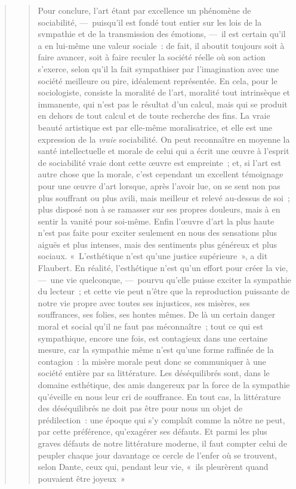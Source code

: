 \documentclass[french,twoside]{book} %
\newcommand\chapterclose{} %
\begin{document}
\begin{verse}
\begin{verse}
Pour conclure, l’art étant par excellence un phénomène de sociabilité, — puisqu’il est fondé tout entier sur les lois de la svmpathie et de la transmission des émotions, — il est certain qu’il a en lui-même une valeur sociale : de fait, il aboutit toujours soit à faire avancer, soit à faire reculer la société réelle où son action s’exerce, selon qu’il la fait sympathiser par l’imagination avec une société meilleure ou pire, idéalement représentée. En cela, pour le sociologiste, consiste la moralité de l’art, moralité tout intrinsèque et immanente, qui n’est pas le résultat d’un calcul, mais qui se produit en dehors de tout calcul et de toute recherche des fins. La vraie beauté artistique est par elle-même moralisatrice, et elle est une expression de la \emph{vraie} sociabilité. On peut reconnaître en moyenne la santé intellectuelle et morale de celui qui a écrit une œuvre à l’esprit de sociabilité vraie dont cette œuvre est empreinte ; et, si l’art est autre chose que la morale, c’est cependant un excellent témoignage pour une œuvre d’art lorsque, après l’avoir lue, on se sent non pas plus souffrant ou plus avili, mais meilleur et relevé au-dessus de soi ; plus disposé non à se ramasser sur ses propres douleurs, mais à en sentir la vanité pour soi-même. Enfin l’œuvre d’art la plus haute n’est pas faite pour exciter seulement en nous des sensations plus aiguës et plus intenses, mais des sentiments plus généreux et plus sociaux. « L’esthétique n’est qu’une justice supérieure », a dit Flaubert. En réalité, l’esthétique n’est qu’un effort pour créer la vie, — une vie quelconque, — pourvu qu’elle puisse exciter la sympathie du lecteur ; et cette vie peut n’être que la reproduction puissante de notre vie propre avec toutes ses injustices, ses misères, ses souffrances, ses folies, ses hontes mêmes. De là un certain danger moral et social qu’il ne faut pas méconnaître ; tout ce qui est sympathique, encore une fois, est contagieux dans une certaine mesure, car la sympathie même n’est qu’une forme raffinée de la contagion : la misère morale peut donc se communiquer à une société entière par sa littérature. Les déséquilibrés sont, dans le domaine esthétique, des amis dangereux par la force de la sympathie qu’éveille en nous leur cri de souffrance. En tout cas, la littérature des déséquilibrés ne doit pas être pour nous un objet de prédilection : une époque qui s’y complaît comme la nôtre ne peut, par cette préférence, qu’exagérer ses défauts. Et parmi les plus graves défauts de notre littérature moderne, il faut compter celui de peupler chaque jour davantage ce cercle de l’enfer où se trouvent, selon Dante, ceux qui, pendant leur vie, « ils pleurèrent quand pouvaient être joyeux »
\chapterclose


\end{verse}
\end{verse}
\end{document}
